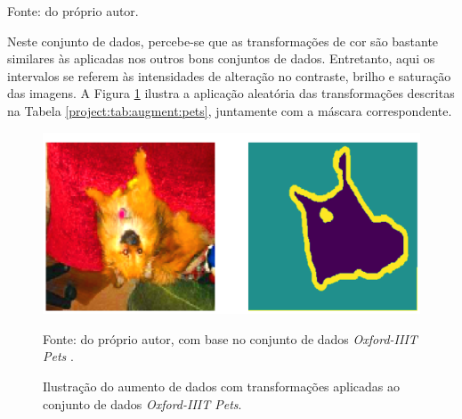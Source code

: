 \begin{table}[H]
    \centering
    \caption{Transformações executadas no conjunto de dados \textit{Oxford-IIIT Pets}.}
    \label{project:tab:augment:pets}

    \vspace*{1 cm}
    Fonte: do próprio autor.
\end{table}

Neste conjunto de dados, percebe-se que as transformações de cor são bastante similares às aplicadas nos outros bons conjuntos de dados. Entretanto, aqui os intervalos se referem às intensidades de alteração no contraste, brilho e saturação das imagens. A Figura \ref{project:fig:augment:pets} ilustra a aplicação aleatória das transformações descritas na Tabela \ref{project:tab:augment:pets}, juntamente com a máscara correspondente.

\begin{figure}[H]
    \centering
    \caption{Ilustração do aumento de dados com transformações aplicadas ao conjunto de dados \textit{Oxford-IIIT Pets}.}
    \label{project:fig:augment:pets}
    \includegraphics[width=1\textwidth]{recursos/imagens/project/dataaugmentation_pets.png}

    Fonte: do próprio autor, com base no conjunto de dados \textit{Oxford-IIIT Pets} \citep{Parkhi2012CatsDogs}.
\end{figure}

